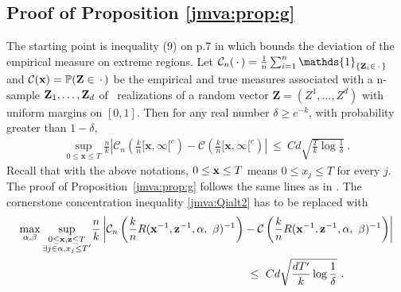 %


\subsection{Proof of Proposition \ref{jmva:prop:g}}
The starting point is inequality (9) on p.7 in \cite{COLT15} which bounds the deviation of the empirical measure on extreme regions. 
Let $\mathcal{C}_n(\point)=\frac{1}{n} \sum_{i=1}^{n} \mathds{1}_{\{\mb Z_i \in \point \}}$ 
and $\mathcal{C}(\mathbf{x})=\mathbb{P}(\mathbf Z \in \,\cdot\,)$ be the empirical and true measures associated with a n-sample $\mathbf Z_1, \ldots, \mathbf Z_d$ of \iid~realizations of a random vector $\mathbf{Z}=(Z^1,\ldots,Z^d)$ with uniform margins on $[0,1]$. Then for any real number $\delta \ge e^{-k}$, 
with probability greater than $1 - \delta$,
\begin{align}
\label{jmva:Qialt2}
\sup_{0 \le \mathbf{x} \le T} \frac{n}{k} \left | \mathcal{C}_n(\frac{k}{n} [\mathbf{x},\boldsymbol{\infty}[^c) - \mathcal{C}(\frac{k}{n} [\mathbf{x},\boldsymbol{\infty}[^c)  \right| ~\le~ C d\sqrt{\frac{T}{k} \log{\frac{1}{\delta}}}~.
\end{align} 
Recall that with the above notations, $0 \le \mathbf x \le T$ means $0 \le x_j \le T$ for every $j$.
The proof of Proposition~\ref{jmva:prop:g} follows the same lines as in \cite{COLT15}. 
The cornerstone concentration inequality \eqref{jmva:Qialt2} has to be replaced with 
\begin{align}
\label{jmva:cornerstone-extension}
\nonumber \max_{\alpha, \beta} \sup_{\substack{  0 \le \mathbf x, \mathbf z \le T \\ \exists j \in \alpha, x_j \le T'}}
&\frac{n}{k} \left | \mathcal{C}_n \left(\frac{k}{n} R(\mathbf x^{-1}, \mathbf z^{-1}, \alpha,~\beta)^{-1}\right) - \mathcal{C}\left(\frac{k}{n} R(\mathbf x^{-1}, \mathbf z^{-1}, \alpha,~\beta)^{-1}\right)  \right|\\
&~~~~~~~~~~~~~~~~~~~~~~~~~~~~~~~~~~~~~~~~~ ~\le~ Cd \sqrt{\frac{dT'}{k} \log{\frac{1}{\delta}}}~.
\end{align}
